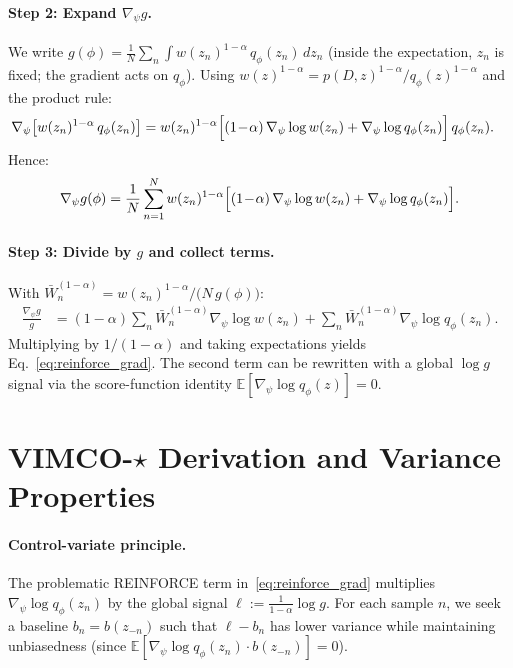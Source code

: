 \documentclass{article}
\theoremstyle{definition}
\theoremstyle{remark}
\newcommand{\E}{\mathbb{E}}
\providecommand{\coloneqq}{:=}
\begin{document}
\paragraph{Step 2: Expand $\nabla_\psi g$.}
We write
$g(\phi)=\frac{1}{N}\sum_n\int w(z_n)^{1-\alpha}\,q_\phi(z_n)\,dz_n$
(inside the expectation, $z_n$ is fixed; the gradient acts on $q_\phi$).
Using $w(z)^{1-\alpha}=p(D,z)^{1-\alpha}/q_\phi(z)^{1-\alpha}$
and the product rule:
\begin{align}
\nabla_\psi\bigl[w(z_n)^{1-\alpha}\,q_\phi(z_n)\bigr]
&= w(z_n)^{1-\alpha}\Bigl[
  (1\!-\!\alpha)\,\nabla_\psi\log w(z_n)
  + \nabla_\psi\log q_\phi(z_n)
\Bigr]\,q_\phi(z_n).
\end{align}
Hence:
\begin{equation}
\nabla_\psi g(\phi)
= \frac{1}{N}\sum_{n=1}^N w(z_n)^{1-\alpha}\Bigl[
  (1\!-\!\alpha)\,\nabla_\psi\log w(z_n)
  +\nabla_\psi\log q_\phi(z_n)
\Bigr].
\end{equation}

\paragraph{Step 3: Divide by $g$ and collect terms.}
With $\bar{W}_n^{(1-\alpha)}=w(z_n)^{1-\alpha}/\bigl(N\,g(\phi)\bigr)$:
\begin{align}
\frac{\nabla_\psi g}{g}
&= (1\!-\!\alpha)\sum_n\bar{W}_n^{(1-\alpha)}\nabla_\psi\log w(z_n)
  + \sum_n\bar{W}_n^{(1-\alpha)}\nabla_\psi\log q_\phi(z_n).
\end{align}
Multiplying by $1/(1-\alpha)$ and taking expectations yields
Eq.~\eqref{eq:reinforce_grad}.
The second term can be rewritten with a global $\log g$ signal via
the score-function identity $\E[\nabla_\psi\log q_\phi(z)]=0$.

\section{VIMCO-$\star$ Derivation and Variance Properties}
\label{app:vimco_star_derivation}

\paragraph{Control-variate principle.}
The problematic REINFORCE term in~\eqref{eq:reinforce_grad} multiplies
$\nabla_\psi\log q_\phi(z_n)$ by the global signal
$\ell\coloneqq\frac{1}{1-\alpha}\log g$.
For each sample $n$, we seek a baseline $b_n=b(z_{-n})$ such that
$\ell-b_n$ has lower variance while maintaining unbiasedness
(since $\E[\nabla_\psi\log q_\phi(z_n)\cdot b(z_{-n})]=0$).
\end{document}
